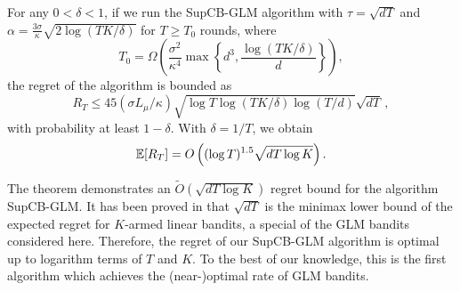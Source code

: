 \begin{theorem} \label{thm:main}
For any $0 < \delta < 1$, if we run the SupCB-GLM algorithm with $\tau=\sqrt{dT}$ and $\alpha=\frac{3\sigma}{\kappa} \sqrt{2\log(TK/\delta)}$ for $T \ge T_0$ rounds, where
\begin{equation} \label{eq:condT}
T_0 = \Omega \left( \frac{\sigma^2}{\kappa^4}\max \left \{d^3, \frac{\log(TK/\delta)}{d} \right\} \right),
\end{equation}
the regret of the algorithm is bounded as
\[ R_T \le  45 (\sigma L_{\mu}/\kappa) \sqrt{\log T \log(TK/\delta)\log(T/d)}  \sqrt{dT}\,,\]
with probability at least $1-\delta$. With $\delta = 1/T$, we obtain \[ \mathbb{E}[R_T] = O\left ((\log T)^{1.5} \sqrt{dT \log K} \right). \]
\end{theorem}

The theorem demonstrates an $\tilde{O}(\sqrt{dT\log K})$ regret bound for the algorithm SupCB-GLM. It has been proved in \citet[Theorem 2]{chu2011contextual} that $\sqrt{dT}$ is the minimax lower bound of the expected regret for $K$-armed linear bandits, a special of the GLM bandits considered here. 
Therefore, the regret of our SupCB-GLM algorithm is optimal up to logarithm terms of $T$ and $K$. To the best of our knowledge, this is the first algorithm which achieves the (near-)optimal rate of GLM bandits.


